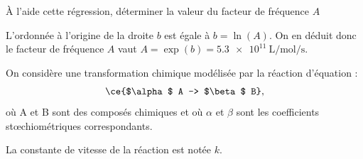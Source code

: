 

\begin{enonce}
À l'aide cette régression, déterminer la valeur du facteur de fréquence $A$
\end{enonce}


\begin{corrige}
L'ordonnée à l'origine de la droite $b$ est égale à $b = \ln(A)$. On en déduit donc le facteur de fréquence $A$ vaut $A = \exp(b) = \SI{5,3e11}{\liter\per\mol\per\second}$.
\end{corrige}



\finEntrainement


\newpage



\medskip

On considère une transformation chimique modélisée par la réaction d'équation :
\[
\ce{$\alpha$ A -> $\beta$ B},
\]
où A et B sont des composés chimiques et où $\alpha$ et $\beta$ sont les coefficients stœchiométriques correspondants.
 
La constante de vitesse de la réaction est notée $k$.



\hauteurLargeurCadreReponse		{7mm}{4cm}
\initialisationEntrainement


